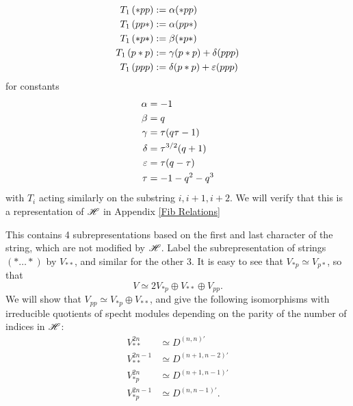 \documentclass{amsart}
\begin{document}
\begin{equation}
  \begin{split}
  T_1 \, (*pp) &:= \alpha(*pp)\\
  T_1 \, (pp*) &:= \alpha(pp*)\\
  T_1 \, (*p*) &:= \beta(*p*)\\
  T_1 \, (p*p) &:= \gamma(p*p) + \delta(ppp)\\
  T_1 \, (ppp) &:= \delta(p*p) + \varepsilon(ppp)
\end{split} \label{Fib Action} 
\end{equation}
for constants
\begin{equation}
  \begin{split}
  \alpha &= -1\\
  \beta &= q\\
  \gamma &= \tau(q\tau - 1)\\
  \delta &= \tau^{3/2}(q + 1)\\
  \varepsilon &= \tau(q-\tau)\\
  \tau &= -1-q^2-q^3
\end{split} \label{Fib Constants} 
\end{equation}
with $T_i$ acting similarly on the substring $i,i+1,i+2$.
We will verify that this is a representation of $\mathscr{H}$ in Appendix \ref{Fib Relations}

This contains 4 subrepresentations based on the first and last character of the string, which are not modified by $\mathscr{H}$.
Label the subrepresentation of strings $(*\dots*)$ by $V_{**}$, and similar for the other 3.
It is easy to see that $V_{*p} \simeq V_{p*}$, so that
\[
  V \simeq 2V_{*p} \oplus V_{**} \oplus V_{pp}.
\]
We will show that $V_{pp} \simeq V_{*p} \oplus V_{**}$, and give the following isomorphisms with irreducible quotients of specht modules depending on the parity of the number of indices in $\mathscr{H}$:
\begin{equation}
  \begin{split}    
    V^{2n}_{**} &\simeq D^{(n,n)'}\\ 
    V^{2n-1}_{**} &\simeq D^{(n+1,n-2)'}\\
    V^{2n}_{*p} &\simeq D^{(n+1,n-1)'}\\
    V^{2n-1}_{*p} &\simeq D^{(n,n-1)'}.
  \end{split} \label{Fib Isos}
\end{equation}
 
\newpage
\end{document}
